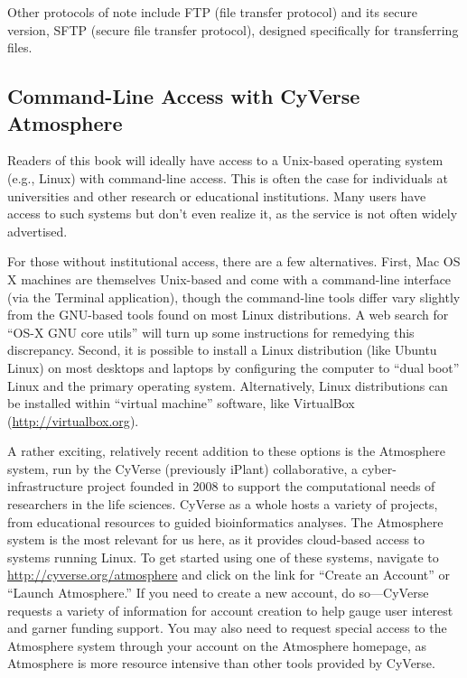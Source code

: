 \documentclass[
]{memoir}
\begin{document}
Other protocols of note include FTP (file transfer protocol) and its secure version, SFTP (secure file transfer protocol), designed specifically for transferring files.

\hypertarget{command-line-access-with-cyverse-atmosphere}{%
\subsection*{Command-Line Access with CyVerse Atmosphere}\label{command-line-access-with-cyverse-atmosphere}}

Readers of this book will ideally have access to a Unix-based operating system (e.g., Linux) with command-line access. This is often the case for individuals at universities and other research or educational institutions. Many users have access to such systems but don't even realize it, as the service is not often widely advertised.

For those without institutional access, there are a few alternatives. First, Mac OS X machines are themselves Unix-based and come with a command-line interface (via the Terminal application), though the command-line tools differ vary slightly from the GNU-based tools found on most Linux distributions. A web search for \enquote{OS-X GNU core utils} will turn up some instructions for remedying this discrepancy. Second, it is possible to install a Linux distribution (like Ubuntu Linux) on most desktops and laptops by configuring the computer to \enquote{dual boot} Linux and the primary operating system. Alternatively, Linux distributions can be installed within \enquote{virtual machine} software, like VirtualBox (\url{http://virtualbox.org}).

A rather exciting, relatively recent addition to these options is the Atmosphere system, run by the CyVerse (previously iPlant) collaborative, a cyber-infrastructure project founded in 2008 to support the computational needs of researchers in the life sciences. CyVerse as a whole hosts a variety of projects, from educational resources to guided bioinformatics analyses. The Atmosphere system is the most relevant for us here, as it provides cloud-based access to systems running Linux. To get started using one of these systems, navigate to \url{http://cyverse.org/atmosphere} and click on the link for \enquote{Create an Account} or \enquote{Launch Atmosphere.} If you need to create a new account, do so---CyVerse requests a variety of information for account creation to help gauge user interest and garner funding support. You may also need to request special access to the Atmosphere system through your account on the Atmosphere homepage, as Atmosphere is more resource intensive than other tools provided by CyVerse.
\end{document}
